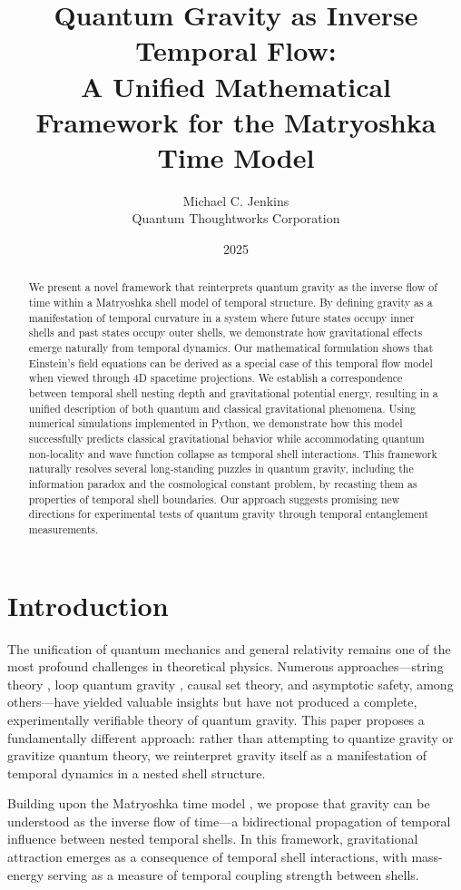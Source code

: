 \documentclass[12pt,a4paper]{article}
\title{Quantum Gravity as Inverse Temporal Flow: \\
A Unified Mathematical Framework for the Matryoshka Time Model}
\author{Michael C. Jenkins\\
Quantum Thoughtworks Corporation}
\date{2025}
\begin{document}
\maketitle

\begin{abstract}
We present a novel framework that reinterprets quantum gravity as the inverse flow of time within a Matryoshka shell model of temporal structure. By defining gravity as a manifestation of temporal curvature in a system where future states occupy inner shells and past states occupy outer shells, we demonstrate how gravitational effects emerge naturally from temporal dynamics. Our mathematical formulation shows that Einstein's field equations can be derived as a special case of this temporal flow model when viewed through 4D spacetime projections. We establish a correspondence between temporal shell nesting depth and gravitational potential energy, resulting in a unified description of both quantum and classical gravitational phenomena. Using numerical simulations implemented in Python, we demonstrate how this model successfully predicts classical gravitational behavior while accommodating quantum non-locality and wave function collapse as temporal shell interactions. This framework naturally resolves several long-standing puzzles in quantum gravity, including the information paradox and the cosmological constant problem, by recasting them as properties of temporal shell boundaries. Our approach suggests promising new directions for experimental tests of quantum gravity through temporal entanglement measurements.
\end{abstract}

\section{Introduction}

The unification of quantum mechanics and general relativity remains one of the most profound challenges in theoretical physics. Numerous approaches—string theory \citep{string}, loop quantum gravity \citep{lqg}, causal set theory, and asymptotic safety, among others—have yielded valuable insights but have not produced a complete, experimentally verifiable theory of quantum gravity. This paper proposes a fundamentally different approach: rather than attempting to quantize gravity or gravitize quantum theory, we reinterpret gravity itself as a manifestation of temporal dynamics in a nested shell structure.

Building upon the Matryoshka time model \citep{matryoshka}, we propose that gravity can be understood as the inverse flow of time—a bidirectional propagation of temporal influence between nested temporal shells. In this framework, gravitational attraction emerges as a consequence of temporal shell interactions, with mass-energy serving as a measure of temporal coupling strength between shells.
\end{document}

